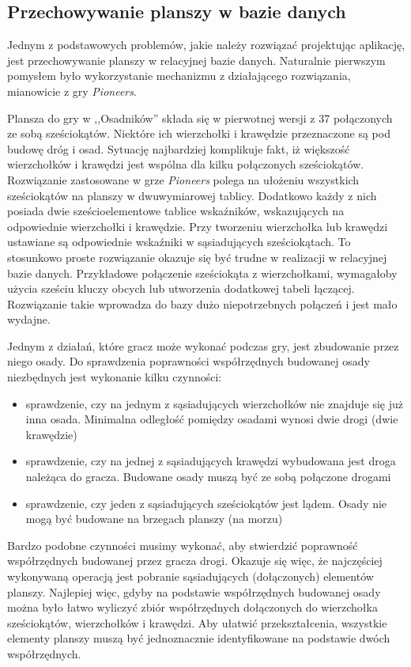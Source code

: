 \documentclass[a4paper,12pt]{article}
\begin{document}
\subsection{Przechowywanie planszy w bazie danych}
Jednym z podstawowych problemów, jakie należy rozwiązać projektując
aplikację, jest przechowywanie planszy w relacyjnej bazie
danych. Naturalnie pierwszym pomysłem było wykorzystanie mechanizmu z
działającego rozwiązania, mianowicie z gry \emph{Pioneers}.

Plansza do gry w ,,Osadników'' składa się w pierwotnej wersji z 37
połączonych ze sobą sześciokątów. Niektóre ich wierzchołki i krawędzie
przeznaczone są pod budowę dróg i osad. Sytuację najbardziej
komplikuje fakt, iż większość wierzchołków i krawędzi jest wspólna dla
kilku połączonych sześciokątów. Rozwiązanie zastosowane w grze
\emph{Pioneers} polega na ułożeniu wszystkich sześciokątów na planszy
w dwuwymiarowej tablicy. Dodatkowo każdy z nich posiada dwie
sześcioelementowe tablice wskaźników, wskazujących na odpowiednie
wierzchołki i krawędzie. Przy tworzeniu wierzchołka lub krawędzi
ustawiane są odpowiednie wskaźniki w sąsiadujących sześciokątach. To
stosunkowo proste rozwiązanie okazuje się być trudne w realizacji w
relacyjnej bazie danych. Przykładowe połączenie sześciokąta z
wierzchołkami, wymagałoby użycia sześciu kluczy obcych lub utworzenia
dodatkowej tabeli łączącej. Rozwiązanie takie wprowadza do bazy dużo
niepotrzebnych połączeń i jest mało wydajne.

Jednym z działań, które gracz może wykonać podczas gry, jest
zbudowanie przez niego osady. Do sprawdzenia poprawności współrzędnych
budowanej osady niezbędnych jest wykonanie kilku czynności:

\begin{itemize}
\item sprawdzenie, czy na jednym z sąsiadujących wierzchołków nie
  znajduje się już inna osada. Minimalna odległość pomiędzy osadami
  wynosi dwie drogi (dwie krawędzie)
\item sprawdzenie, czy na jednej z sąsiadujących krawędzi wybudowana
  jest droga należąca do gracza. Budowane osady muszą być ze sobą
  połączone drogami
\item sprawdzenie, czy jeden z sąsiadujących sześciokątów jest
  lądem. Osady nie mogą być budowane na brzegach planszy (na morzu)
\end{itemize}

Bardzo podobne czynności musimy wykonać, aby stwierdzić poprawność
współrzędnych budowanej przez gracza drogi. Okazuje się więc, że
najczęściej wykonywaną operacją jest pobranie sąsiadujących
(dołączonych) elementów planszy. Najlepiej więc, gdyby na podstawie
współrzędnych budowanej osady można było łatwo wyliczyć zbiór
współrzędnych dołączonych do wierzchołka sześciokątów, wierzchołków i
krawędzi. Aby ułatwić przekształcenia, wszystkie elementy planszy
muszą być jednoznacznie identyfikowane na podstawie dwóch
współrzędnych.
\end{document}
